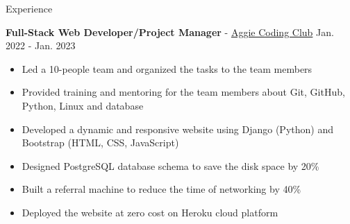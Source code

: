 \documentclass{resume}
\begin{document}
\begin{rSection}{Experience}
    \item \textbf{Full-Stack Web Developer/Project Manager} - \href{https://aggiecodingclub.com}{Aggie Coding Club} \hfill Jan. 2022 - Jan. 2023
    \begin{itemize}
        \item Led a 10-people team and organized the tasks to the team members
        \item Provided training and mentoring for the team members about Git, GitHub, Python, Linux and database
        \item Developed a dynamic and responsive website using Django (Python) and Bootstrap (HTML, CSS, JavaScript)
        \item Designed PostgreSQL database schema to save the disk space by 20\%
        \item Built a referral machine to reduce the time of networking by 40\%
        \item Deployed the website at zero cost on Heroku cloud platform
    \end{itemize}


\end{rSection}
\end{document}
